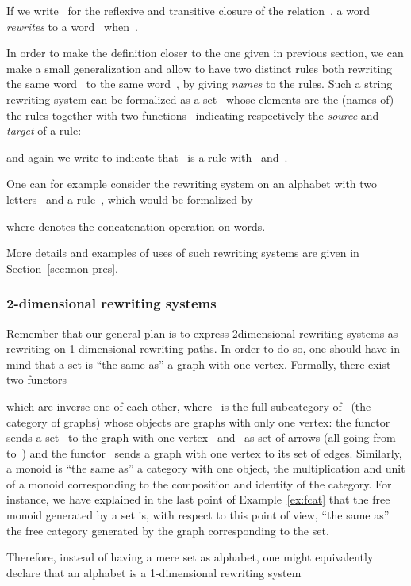 \documentclass{LMCS}
\begin{document}
\noindent If we write~ for the reflexive and transitive closure of the
relation~, a word~ \emph{rewrites} to a word~ when~.

In order to make the definition closer to the one given in previous section, we
can make a small generalization and allow to have two distinct rules both
rewriting the same word~ to the same word~, by giving \emph{names} to the
rules. Such a string rewriting system can be formalized as a set~ whose
elements are the (names of) the rules together with two
functions~ indicating respectively the \emph{source} and
\emph{target} of a rule:

and again we write  to indicate that~ is a rule
with~ and~.

\begin{exa}
  \label{ex:str-rs}
  One can for example consider the rewriting system on an alphabet with two
  letters~ and a rule~, which would be formalized by
  
  where  denotes the concatenation operation on words.
\end{exa}

\noindent
More details and examples of uses of such rewriting systems are given in
Section~\ref{sec:mon-pres}.

\subsubsection{2-dimensional rewriting systems}
\label{sec:2-rs}
Remember that our general plan is to express 2\nbd{}dimensional rewriting
systems as rewriting on 1-dimensional rewriting paths. In order to do so, one
should have in mind that a set is ``the same as'' a graph with one
vertex. Formally, there exist two functors

which are inverse one of each other, where~ is the full subcategory
of~ (the category of graphs) whose objects are graphs with only one
vertex: the functor~ sends a set~ to the graph with one vertex~
and~ as set of arrows (all going from~ to~) and the
functor~ sends a graph with one vertex to its set of edges. Similarly, a
monoid is ``the same as'' a category with one object, the multiplication and
unit of a monoid corresponding to the composition and identity of the
category. For instance, we have explained in the last point of
Example~\ref{ex:fcat} that the free monoid generated by a set is, with respect
to this point of view, ``the same as'' the free category generated by the graph
corresponding to the set.

Therefore, instead of having a mere set as alphabet, one might equivalently
declare that an alphabet is a 1-dimensional rewriting system
\end{document}
